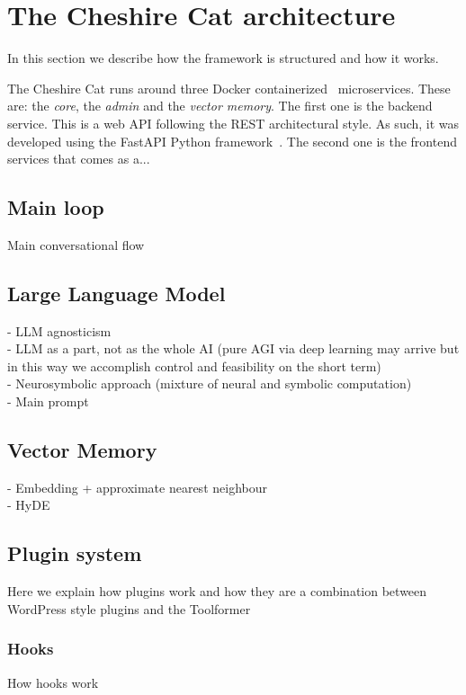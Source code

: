 \documentclass{article}
\begin{document}
\section{The Cheshire Cat architecture}

In this section we describe how the framework is structured and how it works.

The Cheshire Cat runs around three Docker containerized~\cite{merkel2014docker} microservices.
These are: the \emph{core}, the \emph{admin} and the \emph{vector memory}.
The first one is the backend service.
This is a web API following the REST architectural style.
As such, it was developed using the FastAPI Python framework~\cite{lathkar2023introduction}.
The second one is the frontend services that comes as a...

\subsection{Main loop}
Main conversational flow

\subsection{Large Language Model}
- LLM agnosticism\\
- LLM as a part, not as the whole AI (pure AGI via deep learning may arrive but in this way we accomplish control and feasibility on the short term)\\
- Neurosymbolic approach (mixture of neural and symbolic computation)\\
- Main prompt

\subsection{Vector Memory}
- Embedding + approximate nearest neighbour\\
- HyDE

\subsection{Plugin system}
Here we explain how plugins work and how they are a combination between WordPress style plugins and the Toolformer

\subsubsection{Hooks}
How hooks work
\end{document}
